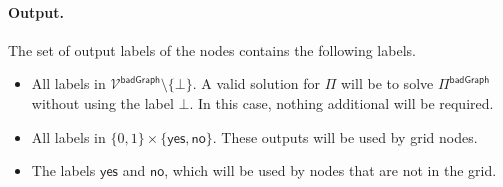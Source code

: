\documentclass[11pt]{article}
\newcommand{\lbadgraph}{\mathsf {badGraph}}
\newcommand{\lyes}{\mathsf {yes}}
\newcommand{\lno}{\mathsf {no}}
\begin{document}
\paragraph{Output.}
The set of output labels of the nodes contains the following labels.
\begin{itemize}
	\item All labels in $\mathcal{V^\lbadgraph}\setminus\{\bot\}$. A valid solution for $\Pi$ will be to solve $\Pi^{\lbadgraph}$ without using the label $\bot$. In this case, nothing additional will be required.
	\item All labels in $\{0,1\} \times \{\lyes,\lno\}$. These outputs will be used by grid nodes.
	\item The labels $\lyes$ and $\lno$, which will be used by nodes that are not in the grid.
\end{itemize} 
\end{document}
